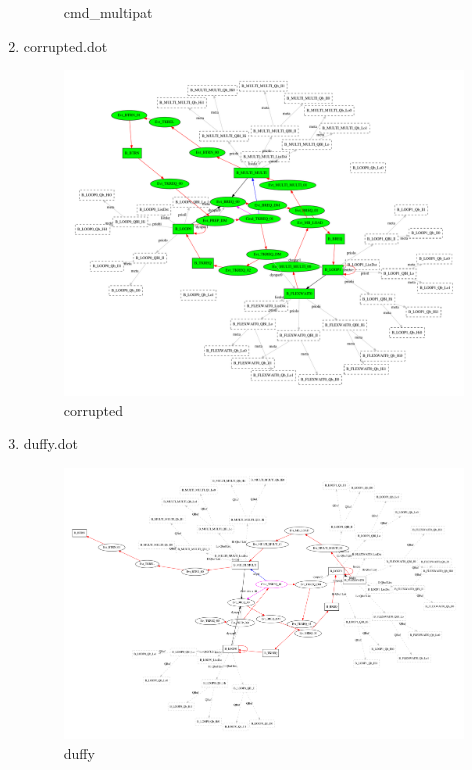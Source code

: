 \documentclass[12pt,a4paper]{report}
\begin{document}
\begin{enumerate}
\begin{figure}
        \caption{cmd\_multipat}
        \label{fig:cmd_multipat}
    \end{figure}
\item corrupted.dot
    \begin{figure}
        \centering 
        \includegraphics*[width=1.0\textwidth,keepaspectratio]{TestPattern/corrupted.pdf}
        \caption{corrupted}
        \label{fig:corrupted}
    \end{figure}
\item duffy.dot
    \begin{figure}
        \centering 
        \includegraphics*[width=1.0\textwidth,keepaspectratio]{TestPattern/duffy.pdf}
        \caption{duffy}
        \label{fig:duffy}
    \end{figure}

\end{enumerate}
\end{document}
